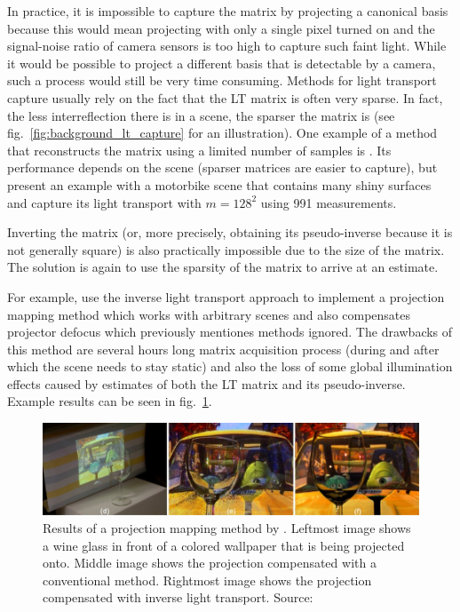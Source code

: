 In practice, it is impossible to capture the matrix by projecting a canonical basis because this would mean projecting with only a single pixel turned on and the signal-noise ratio of camera sensors is too high to capture such faint light. While it would be possible to project a different basis that is detectable by a camera, such a process would still be very time consuming. Methods for light transport capture usually rely on the fact that the LT matrix is often very sparse. In fact, the less interreflection there is in a scene, the sparser the matrix is (see fig.~\ref{fig:background_lt_capture} for an illustration). One example of a method that reconstructs the matrix using a limited number of samples is \citet{Peers2009}. Its performance depends on the scene (sparser matrices are easier to capture), but \citet{Peers2009} present an example with a motorbike scene that contains many shiny surfaces and capture its light transport with \(m = 128^2\) using 991 measurements.

Inverting the matrix (or, more precisely, obtaining its pseudo-inverse because it is not generally square) is also practically impossible due to the size of the matrix. The solution is again to use the sparsity of the matrix to arrive at an estimate.

For example, \citet{Wetzstein2007} use the inverse light transport approach to implement a projection mapping method which works with arbitrary scenes and also compensates projector defocus which previously mentiones methods ignored. The drawbacks of this method are several hours long matrix acquisition process (during and after which the scene needs to stay static) and also the loss of some global illumination effects caused by estimates of both the LT matrix and its pseudo-inverse. Example results can be seen in fig.~\ref{fig:background_wetzstein_result}.

\begin{figure}
    \centering
    \includegraphics[width=\textwidth]{images/02-wetzstein_result_crop.jpg}
    \caption{Results of a projection mapping method by \citet{Wetzstein2007}. Leftmost image shows a wine glass in front of a colored wallpaper that is being projected onto. Middle image shows the projection compensated with a conventional method. Rightmost image shows the projection compensated with inverse light transport. Source: \citet{Wetzstein2007}}
    \label{fig:background_wetzstein_result}
\end{figure}

